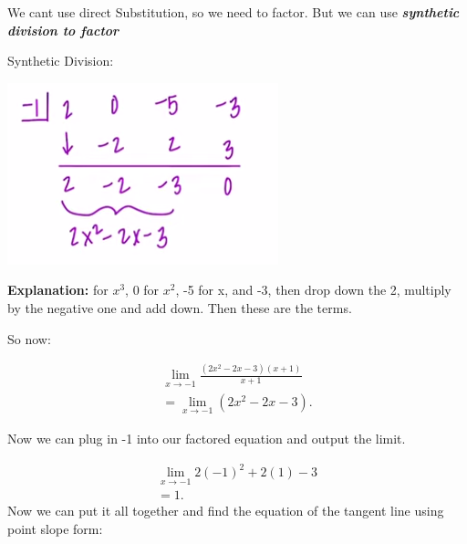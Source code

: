 \documentclass{report}
\begin{document}
        \bigbreak \noindent 
        We cant use direct Substitution, so we need to factor. But we can use \textbf{\textit{synthetic division to factor}}

        \begin{center}
            Synthetic Division:
        \end{center}

        \begin{center}
            \includegraphics[scale=0.5]{../images/21.png}
        \end{center}

        \bigbreak \noindent 
        \textbf{Explanation:}
        \bigbreak {} for $x^3$, 0 for $x^2$, -5 for x, and -3, then drop down the 2, multiply by the negative one and
        add down. Then these are the terms.

        \bigbreak \noindent 
        \begin{center}
            So now:
        \end{center}
        \begin{align*}
            \lim\limits_{x \to -1}{ \frac{ \left(2x^2-2x-3\right) \left(x+1\right)}{x+1}} \\ 
            = \lim\limits_{x \to -1}{ \left(2x^2-2x-3\right)}
        .\end{align*}

        \bigbreak \noindent 
        Now we can plug in -1 into our factored equation and output the limit.

        \begin{align*}
            \lim\limits_{x \to -1}{2 \left(-1\right)^2 + 2 \left(1\right) - 3} \\ 
            = 1
        .\end{align*}
        \bigbreak \noindent 
        Now we can put it all together and find the equation of the tangent line using point slope form:
\end{document}
